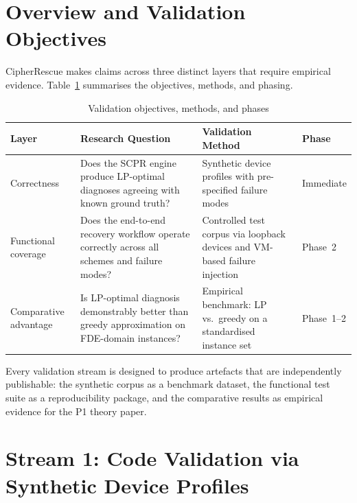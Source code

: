 \documentclass[11pt,a4paper]{report}
\begin{document}
\section{Overview and Validation Objectives}
\label{sec:empirical:overview}

CipherRescue makes claims across three distinct layers that require empirical evidence.
Table~\ref{tab:validationobj} summarises the objectives, methods, and phasing.

\begin{table}[htbp]
\centering
\caption{Validation objectives, methods, and phases}
\label{tab:validationobj}
\begin{tabular}{@{}p{2.2cm}p{4.8cm}p{4.8cm}l@{}}
\toprule
\textbf{Layer} & \textbf{Research Question} & \textbf{Validation Method} & \textbf{Phase} \\
\midrule
Correctness &
  Does the SCPR engine produce LP-optimal diagnoses agreeing with known ground truth? &
  Synthetic device profiles with pre-specified failure modes &
  Immediate \\[6pt]
Functional coverage &
  Does the end-to-end recovery workflow operate correctly across all schemes and failure modes? &
  Controlled test corpus via loopback devices and VM-based failure injection &
  Phase~2 \\[6pt]
Comparative advantage &
  Is LP-optimal diagnosis demonstrably better than greedy approximation on FDE-domain instances? &
  Empirical benchmark: LP vs.\ greedy on a standardised instance set &
  Phase~1--2 \\
\bottomrule
\end{tabular}
\end{table}

\begin{tcolorbox}[enhanced, colback=lightblue!40, colframe=royalblue, arc=4pt,
  fonttitle=\bfseries, title={Design Principle}]
Every validation stream is designed to produce artefacts that are independently
publishable: the synthetic corpus as a benchmark dataset, the functional test suite as a
reproducibility package, and the comparative results as empirical evidence for the P1
theory paper.
\end{tcolorbox}

\section{Stream 1: Code Validation via Synthetic Device Profiles}
\label{sec:empirical:stream1}
\end{document}
